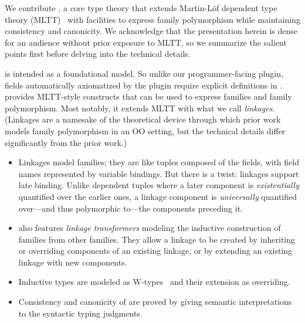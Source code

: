 We contribute \TT, a core type theory that extends
Martin-Löf dependent type theory (MLTT)~\cite{martin1982constructive}
with facilities to express family polymorphism
while maintaining consistency and canonicity.
%
We acknowledge that the presentation herein is dense for an audience
without prior exposure to MLTT, so we summarize the salient points
first before delving into the technical details.


\TT is intended as a foundational model. So unlike our programmer-facing plugin,
fields automatically axiomatized by the plugin require explicit definitions in \TT.
%
\TT provides MLTT-style constructs that can be used to express families and
family polymorphism. %
%
Most notably, it extends MLTT with what we call \emph{linkages}.
(Linkages are a namesake of the theoretical device through which prior work~\cite{zm2017} models
family polymorphism in an OO setting, but the technical details differ significantly from the prior work.)

\begin{itemize}
[labelsep=*,leftmargin=1pc,itemsep=3pt]
\item 
Linkages model families; they are like tuples composed of the fields,
with field names represented by variable bindings.
But there is a twist: linkages support late binding.
Unlike dependent tuples where a later component is \emph{existentially}
quantified over the earlier ones, a linkage component is \emph{universally}
quantified over---and thus polymorphic to---the components preceding it.

\item
\TT also features \emph{linkage transformers} modeling the inductive
construction of families from other families.
They allow a linkage to be created by inheriting or
overriding components of an existing linkage, or by extending an existing
linkage with new components.

\item
Inductive types are modeled as W-types~\cite{martin1984intuitionistic} and their
extension as overriding.

\item
Consistency and canonicity of \TT are proved by giving semantic interpretations to the syntactic typing judgments.
\end{itemize}

